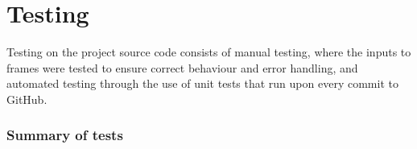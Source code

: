 \documentclass[./project-report/src/latex/project-report.tex]{subfiles}
\begin{document}
\maketitle

\clearpage
\section{Testing}

Testing on the project source code consists of manual testing, where the inputs to frames were tested to ensure correct behaviour and error handling, and automated testing 
through the use of unit tests that run upon every commit to GitHub.

\subsubsection{Summary of tests}
\end{document}
